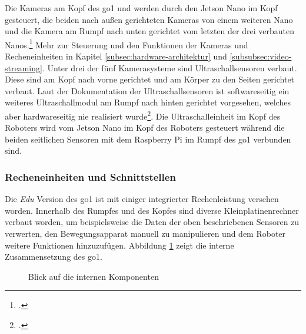 Die Kameras am Kopf des \gls{go1}  und  werden durch den Jetson Nano im Kopf gesteuert, die beiden
nach außen gerichteten Kameras  von einem weiteren Nano und die Kamera am Rumpf nach unten gerichtet 
vom letzten der drei verbauten Nanos.\footcite{go1_kamera_anleitung}
Mehr zur Steuerung und den Funktionen der Kameras und Recheneinheiten in Kapitel \ref{subsec:hardware-architektur} und
\ref{subsubsec:video-streaming}.
Unter drei der fünf Kamerasysteme sind Ultraschallsensoren verbaut.
Diese sind am Kopf nach vorne gerichtet  und am Körper zu den Seiten gerichtet  verbaut.
Laut der Dokumentation der Ultraschallsensoren ist softwareseitig ein weiteres Ultraschallmodul am Rumpf nach hinten
gerichtet  vorgesehen, welches aber hardwareseitig nie realisiert wurde\footcite{go1_ultraschall_anleitung}.
Die Ultraschalleinheit im Kopf des Roboters wird vom Jetson Nano im Kopf des Roboters gesteuert während die beiden seitlichen
Sensoren mit dem Raspberry Pi im Rumpf des \gls{go1} verbunden sind.


\subsubsection{Recheneinheiten und Schnittstellen}

Die \emph{Edu} Version des \gls{go1} ist mit einiger integrierter Rechenleistung versehen worden.
Innerhalb des Rumpfes und des Kopfes sind diverse Kleinplatinenrechner verbaut worden, um beispielsweise die Daten der oben beschriebenen
Sensoren zu verwerten, den Bewegungsapparat manuell zu manipulieren und dem Roboter weitere Funktionen hinzuzufügen.
Abbildung \ref{fig:intern} zeigt die interne Zusammensetzung des \gls{go1}.

\begin{figure}[h]
    \caption{Blick auf die internen Komponenten}\label{fig:intern}
\end{figure}

